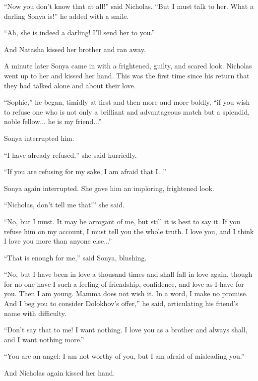 ``Now you don't know that at all!'' said Nicholas. ``But I must
talk to her. What a darling Sonya is!'' he added with a smile.

``Ah, she is indeed a darling! I'll send her to you.''

And Natasha kissed her brother and ran away.

A minute later Sonya came in with a frightened, guilty, and
scared look.  Nicholas went up to her and kissed her hand. This
was the first time since his return that they had talked alone
and about their love.

``Sophie,'' he began, timidly at first and then more and more
boldly, ``if you wish to refuse one who is not only a brilliant
and advantageous match but a splendid, noble fellow... he is my
friend...''

Sonya interrupted him.

``I have already refused,'' she said hurriedly.

``If you are refusing for my sake, I am afraid that I...''

Sonya again interrupted. She gave him an imploring, frightened
look.

``Nicholas, don't tell me that!'' she said.

``No, but I must. It may be arrogant of me, but still it is best
to say it. If you refuse him on my account, I must tell you the
whole truth. I love you, and I think I love you more than anyone
else...''

``That is enough for me,'' said Sonya, blushing.

``No, but I have been in love a thousand times and shall fall in
love again, though for no one have I such a feeling of
friendship, confidence, and love as I have for you. Then I am
young. Mamma does not wish it. In a word, I make no promise. And
I beg you to consider Dolokhov's offer,'' he said, articulating
his friend's name with difficulty.

``Don't say that to me! I want nothing. I love you as a brother
and always shall, and I want nothing more.''

``You are an angel: I am not worthy of you, but I am afraid of
misleading you.''

And Nicholas again kissed her hand.


